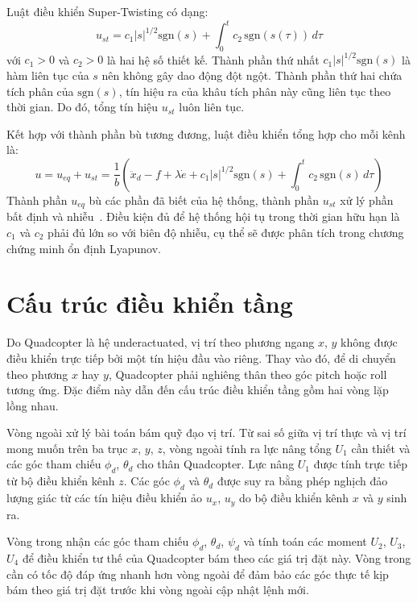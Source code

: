 \documentclass[12pt,a4paper]{report}
\begin{document}
Luật điều khiển Super-Twisting có dạng:
\begin{equation}
u_{st} = c_1 |s|^{1/2} \text{sgn}(s) + \int_0^t c_2 \, \text{sgn}(s(\tau)) \, d\tau
\end{equation}
với $c_1 > 0$ và $c_2 > 0$ là hai hệ số thiết kế. Thành phần thứ nhất $c_1 |s|^{1/2} \text{sgn}(s)$ là hàm liên tục của $s$ nên không gây dao động đột ngột. Thành phần thứ hai chứa tích phân của $\text{sgn}(s)$, tín hiệu ra của khâu tích phân này cũng liên tục theo thời gian. Do đó, tổng tín hiệu $u_{st}$ luôn liên tục.

Kết hợp với thành phần bù tương đương, luật điều khiển tổng hợp cho mỗi kênh là:
\begin{equation}
u = u_{eq} + u_{st} = \frac{1}{b} \left( \ddot{x}_d - f + \lambda \dot{e} + c_1 |s|^{1/2} \text{sgn}(s) + \int_0^t c_2 \, \text{sgn}(s) \, d\tau \right)
\end{equation}
Thành phần $u_{eq}$ bù các phần đã biết của hệ thống, thành phần $u_{st}$ xử lý phần bất định và nhiễu~\cite{shtessel2014,besnard2012}. Điều kiện đủ để hệ thống hội tụ trong thời gian hữu hạn là $c_1$ và $c_2$ phải đủ lớn so với biên độ nhiễu, cụ thể sẽ được phân tích trong chương chứng minh ổn định Lyapunov.

\section{Cấu trúc điều khiển tầng}
Do Quadcopter là hệ underactuated, vị trí theo phương ngang $x$, $y$ không được điều khiển trực tiếp bởi một tín hiệu đầu vào riêng. Thay vào đó, để di chuyển theo phương $x$ hay $y$, Quadcopter phải nghiêng thân theo góc pitch hoặc roll tương ứng. Đặc điểm này dẫn đến cấu trúc điều khiển tầng gồm hai vòng lặp lồng nhau.

Vòng ngoài xử lý bài toán bám quỹ đạo vị trí. Từ sai số giữa vị trí thực và vị trí mong muốn trên ba trục $x$, $y$, $z$, vòng ngoài tính ra lực nâng tổng $U_1$ cần thiết và các góc tham chiếu $\phi_d$, $\theta_d$ cho thân Quadcopter. Lực nâng $U_1$ được tính trực tiếp từ bộ điều khiển kênh $z$. Các góc $\phi_d$ và $\theta_d$ được suy ra bằng phép nghịch đảo lượng giác từ các tín hiệu điều khiển ảo $u_x$, $u_y$ do bộ điều khiển kênh $x$ và $y$ sinh ra.

Vòng trong nhận các góc tham chiếu $\phi_d$, $\theta_d$, $\psi_d$ và tính toán các moment $U_2$, $U_3$, $U_4$ để điều khiển tư thế của Quadcopter bám theo các giá trị đặt này. Vòng trong cần có tốc độ đáp ứng nhanh hơn vòng ngoài để đảm bảo các góc thực tế kịp bám theo giá trị đặt trước khi vòng ngoài cập nhật lệnh mới.
\end{document}
